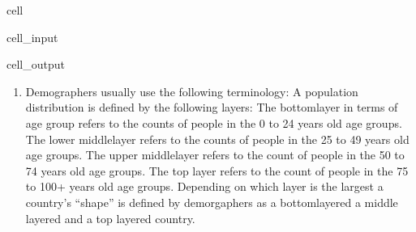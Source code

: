 \documentclass[letterpaper,10pt,english]{jupyterBook}
\begin{document}
\begin{sphinxuseclass}{cell}\begin{sphinxVerbatimInput}

\begin{sphinxuseclass}{cell_input}
\begin{sphinxVerbatim}[commandchars=\\\{\}]
\end{sphinxVerbatim}

\end{sphinxuseclass}\end{sphinxVerbatimInput}
\begin{sphinxVerbatimOutput}

\begin{sphinxuseclass}{cell_output}
\noindent{}

\end{sphinxuseclass}\end{sphinxVerbatimOutput}

\end{sphinxuseclass}\begin{enumerate}
%
\setcounter{enumi}{1}
\item {} 
\sphinxAtStartPar
Demographers usually use the following terminology: A population distribution is defined by the following layers: The bottom\sphinxhyphen{}layer in terms of age group refers to the counts of people in the 0 to 24 years old age groups.
The lower middle\sphinxhyphen{}layer refers to the counts of people in the 25 to 49 years old age groups. The upper middle\sphinxhyphen{}layer refers to the count of people in the 50 to 74 years old age groups. The top layer refers to the count of people in the 75 to 100+ years old age groups. Depending on which layer is the largest a country’s “shape” is defined by demorgaphers as a bottom\sphinxhyphen{}layered a middle layered and a top layered country.

\end{enumerate}
\end{document}
